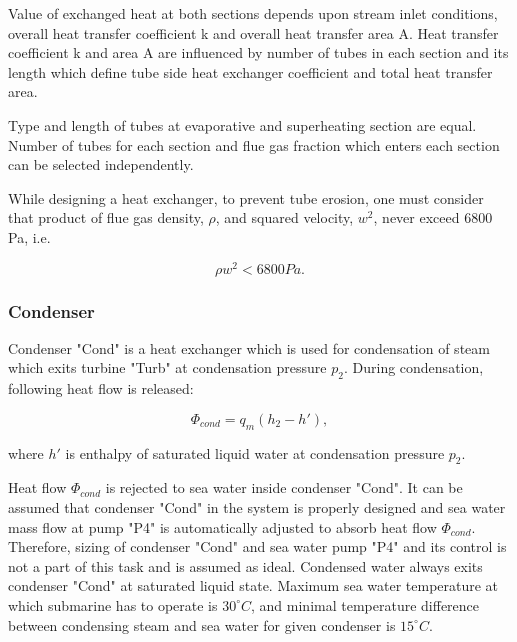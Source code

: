 \documentclass[openany]{book}
\begin{document}
	\noindent
	Value of exchanged heat at both sections depends upon stream inlet 
	conditions, overall heat transfer coefficient k and overall heat transfer 
	area A. Heat transfer coefficient k and area A are influenced by number of 
	tubes in each section and its length which define tube side heat exchanger 
	coefficient and total heat transfer area.
	
	Type and length of tubes at evaporative and superheating section are equal. 
	Number of tubes for each section and flue gas fraction which enters each 
	section can be selected independently.  
	
	While designing a heat exchanger, to prevent tube erosion, one must 
	consider that product of flue gas density, $\rho$, and squared velocity, 
	$w^2$, never exceed $6800$  Pa,  i.e. 
	
	\begin{equation}\label{eq:flue_gas_density}
	\rho w^2 < 6800 Pa.
	\end{equation}
	
	\subsubsection*{Condenser}
	
	\noindent
	Condenser "Cond" is a heat exchanger which is used for condensation of 
	steam which exits turbine "Turb" at condensation pressure $p_2$. During 
	condensation, following heat flow is released:
	
	\begin{equation}\label{eq:heat_flow_cond}
	\Phi_{cond} = q_m (h_2 - h'),
	\end{equation}
	
	\noindent
	where $h'$ is enthalpy of saturated liquid water at condensation pressure 
	$p_2$.
	
	\noindent
	Heat flow $\Phi_{cond}$ is rejected to sea water inside condenser "Cond". 
	It can be assumed that condenser "Cond" in the system is properly designed 
	and sea water mass flow at pump "P4" is automatically adjusted to absorb 
	heat flow $\Phi_{cond}$. Therefore, sizing of condenser "Cond" and sea 
	water pump "P4" and its control is not a part of this task and is assumed 
	as ideal. Condensed water always exits condenser "Cond" at saturated liquid 
	state.
	Maximum sea water temperature at which submarine has to operate is 
	$30^{\circ}C$, and minimal temperature difference between condensing steam 
	and sea water for given condenser is $15^{\circ}C$. 
	
\end{document}
